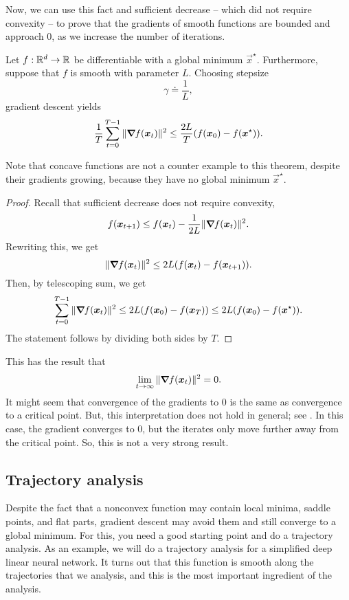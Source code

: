 Now, we can use this fact and sufficient decrease -- which did not require convexity -- to prove
that the gradients of smooth functions are bounded and approach 0, as we increase the number of
iterations.

\begin{theorem}
    Let $f: \mathbb{R}^d \to \mathbb{R}$ be differentiable with a global minimum $\vec{x}^\star$. Furthermore, suppose that $f$ is smooth with parameter $L$. Choosing stepsize \[
        \gamma \doteq \frac{1}{L},
    \]
    gradient descent yields \[
        \frac{1}{T} \sum_{t=0}^{T-1} \| \bm{\nabla}_{\! } f(\bm{x}_t) \|^2 \leq \frac{2L}{T} (f(\bm{x}_0) - f(\bm{x}^\star)).
    \]
\end{theorem}

\begin{remark}
    Note that concave functions are not a counter example to this theorem, despite their gradients
    growing, because they have no global minimum $\vec{x}^\star$.
\end{remark}

\begin{proof}
    Recall that sufficient decrease does not require convexity, \[
        f(\bm{x}_{t+1}) \leq f(\bm{x}_t) - \frac{1}{2L} \| \bm{\nabla}_{\! } f(\bm{x}_t) \|^2.
    \]
    Rewriting this, we get \[
        \| \bm{\nabla}_{\! } f(\bm{x}_t) \|^2 \leq 2L (f(\bm{x}_t) - f(\bm{x}_{t+1})).
    \]
    Then, by telescoping sum, we get \[
        \sum_{t=0}^{T-1} \| \bm{\nabla}_{\! } f(\bm{x}_t) \|^2 \leq 2L (f(\bm{x}_0) - f(\bm{x}_T)) \leq 2L (f(\bm{x}_0) - f(\bm{x}^\star)).
    \]
    The statement follows by dividing both sides by $T$.
\end{proof}

This has the result that \[
    \lim_{t \to \infty} \| \bm{\nabla}_{\! } f(\bm{x}_t) \|^2 = 0.
\]
It might seem that convergence of the gradients to 0 is the same as convergence to a critical
point. But, this interpretation does not hold in general; see . In this
case, the gradient converges to 0, but the iterates only move further away from the critical point.
So, this is not a very strong result.

\subsection{Trajectory analysis}

Despite the fact that a nonconvex function may contain local minima, saddle points, and flat parts,
gradient descent may avoid them and still converge to a global minimum. For this, you need a good
starting point and do a trajectory analysis. As an example, we will do a trajectory analysis for a
simplified deep linear neural network. It turns out that this function is smooth along the
trajectories that we analysis, and this is the most important ingredient of the analysis.

